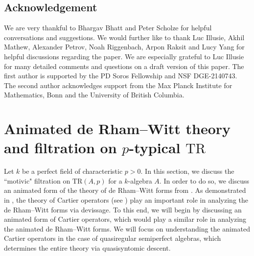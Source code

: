 \documentclass[10pt,letterpaper]{amsart}
\newcommand{\stodo}[1]{{\todo[size = \tiny]{#1}}}
\numberwithin{figure}{section}
\numberwithin{equation}{section}
\theoremstyle{definition}
\theoremstyle{definition}
\theoremstyle{definition}
\theoremstyle{definition}
\newcommand{\TR}{\mathrm{TR}}
\begin{document}
\subsection*{Acknowledgement}We are very thankful to Bhargav Bhatt and Peter Scholze for helpful conversations and suggestions. We would further like to thank Luc Illusie, Akhil Mathew, Alexander Petrov, Noah Riggenbach, Arpon Raksit and Lucy Yang for helpful discussions regarding the paper. We are especially grateful to Luc Illusie for many detailed comments and questions on a draft version of this paper. The first author is supported by the PD Soros Fellowship and NSF DGE-2140743. The second author acknowledges support from the Max Planck Institute for Mathematics, Bonn and the University of British Columbia.


\section{Animated de Rham--Witt theory and filtration on $p$-typical $\TR$}\label{sec2}Let $k$ be a perfect field of characteristic $p>0.$ In this section, we discuss the ``motivic" filtration on $\mathrm{TR}(A,p)$ for a $k$-algebra $A.$ In order to do so, we discuss an animated form of the theory of de Rham--Witt forms from \cite{Luc1}. As demonstrated in \cite{Luc1}, the theory of Cartier operators (see \cite[\S~2]{Luc1}) play an important role in analyzing the de Rham--Witt forms via devissage. To this end, we will begin by discussing an animated form of Cartier operators, which would play a similar role in analyzing the animated de Rham--Witt forms. We will focus on understanding the animated Cartier operators in the case of quasiregular semiperfect algebras, which determines the entire theory via quasisyntomic descent.





\end{document}
